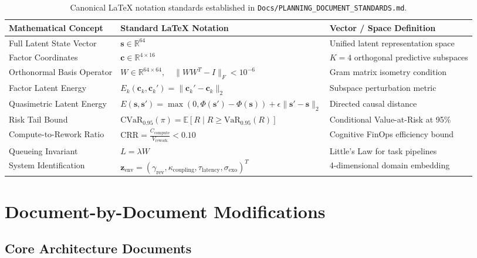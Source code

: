 \documentclass[11pt,a4paper]{article}
\begin{document}
\begin{table}[h!]
\centering
\small
\begin{tabular}{lll}
\toprule
\textbf{Mathematical Concept} & \textbf{Standard \LaTeX{} Notation} & \textbf{Vector / Space Definition} \\
\midrule
Full Latent State Vector & $\mathbf{s} \in \mathbb{R}^{64}$ & Unified latent representation space \\
Factor Coordinates & $\mathbf{c} \in \mathbb{R}^{4 \times 16}$ & $K=4$ orthogonal predictive subspaces \\
Orthonormal Basis Operator & $W \in \mathbb{R}^{64 \times 64}, \quad \|W W^T - I\|_F < 10^{-6}$ & Gram matrix isometry condition \\
Factor Latent Energy & $E_k(\mathbf{c}_k, \mathbf{c}_k') = \|\mathbf{c}_k' - \mathbf{c}_k\|_2$ & Subspace perturbation metric \\
Quasimetric Latent Energy & $E(\mathbf{s}, \mathbf{s}') = \max(0, \Phi(\mathbf{s}') - \Phi(\mathbf{s})) + \epsilon \|\mathbf{s}' - \mathbf{s}\|_2$ & Directed causal distance \\
Risk Tail Bound & $\text{CVaR}_{0.95}(\pi) = \mathbb{E}[R \mid R \ge \text{VaR}_{0.95}(R)]$ & Conditional Value-at-Risk at 95\% \\
Compute-to-Rework Ratio & $\text{CRR} = \frac{C_{\text{compute}}}{V_{\text{rework}}} < 0.10$ & Cognitive FinOps efficiency bound \\
Queueing Invariant & $L = \lambda W$ & Little's Law for task pipelines \\
System Identification & $\mathbf{z}_{\text{env}} = (\gamma_{\text{rev}}, \kappa_{\text{coupling}}, \tau_{\text{latency}}, \sigma_{\text{exo}})^T$ & 4-dimensional domain embedding \\
\bottomrule
\end{tabular}
\caption{Canonical \LaTeX{} notation standards established in \texttt{Docs/PLANNING\_DOCUMENT\_STANDARDS.md}.}
\label{tab:notation_standards}
\end{table}

\section{Document-by-Document Modifications}

\subsection{Core Architecture Documents}
\end{document}
